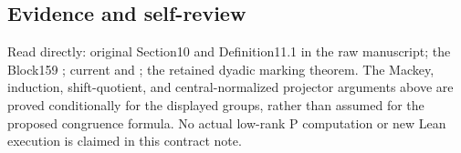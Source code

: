 \hypertarget{lowrank_contract-evidence-and-self-review}{%
\subsection{Evidence and self-review}\label{lowrank_contract-evidence-and-self-review}}

Read directly: original Section10 and Definition11.1 in the raw
manuscript; the Block159 ;
current  and ; the retained dyadic marking
theorem. The Mackey, induction, shift-quotient, and central-normalized
projector arguments above are proved conditionally for the displayed
groups, rather than assumed for the proposed congruence formula. No
actual low-rank P computation or new Lean execution is claimed in this
contract note.
